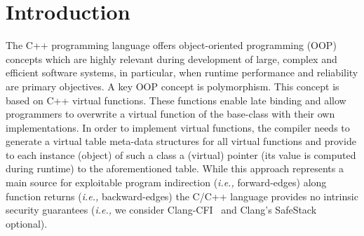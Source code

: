 \section{Introduction}
\label{chapter:Introduction}

The C++ programming language offers object-oriented programming (OOP) concepts which are highly relevant 
during development of large, complex and efficient software systems, in particular, 
when runtime performance and reliability are primary objectives.
A key OOP concept is polymorphism. This concept is based on C++ virtual functions. These functions enable late binding and allow programmers 
to overwrite a virtual function of the base-class with their own implementations. In order to implement virtual functions, 
the compiler needs to generate a virtual table meta-data structures for all virtual functions and provide to each 
instance (object) of such a class a (virtual) pointer (its value is computed during runtime) to the aforementioned table.
While this approach represents a main source for exploitable program indirection (\textit{i.e.,} forward-edges) 
along function returns (\textit{i.e.,} backward-edges) the C/C++ language provides no intrinsic security guarantees 
(\textit{i.e.,} we consider Clang-CFI~\cite{clang:cfi} and Clang's SafeStack \cite{safestack} optional). 


